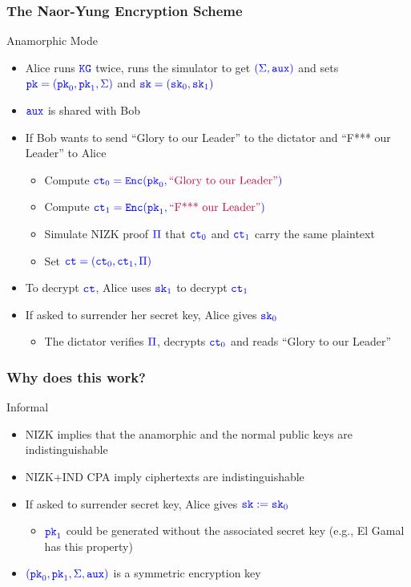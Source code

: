 \documentclass[handout]{beamer}
\begin{document}
\begin{frame}
\frametitle{The Naor-Yung Encryption Scheme}
\begin{exampleblock}{Anamorphic Mode}
\begin{itemize}
\item Alice runs $\color{blue} \mathtt{KG}$ twice, runs the simulator to get $\color{blue}(\Sigma,\mathtt{aux})$ 
and sets $\color{blue} \mathtt{pk}=(\mathtt{pk}_0,\mathtt{pk}_1,\Sigma)$ and $\color{blue} \mathtt{sk}=(\mathtt{sk}_0,\mathtt{sk}_1)$
\item $\color{blue}\mathtt{aux}$ is shared with Bob
\item If Bob wants to send {\color{purple} ``Glory to our Leader''} to the dictator
and {\color{purple} ``F*** our Leader''} to Alice
    \begin{itemize}
    \item Compute $\color{blue} \mathtt{ct}_0=\mathtt{Enc}(\mathtt{pk}_0,\text{\color{purple} ``Glory to our Leader''})$
    \item Compute $\color{blue} \mathtt{ct}_1=\mathtt{Enc}(\mathtt{pk}_1,\text{\color{purple} ``F*** our Leader''})$
    \item Simulate NIZK proof $\color{blue} \Pi$ that $\color{blue} \mathtt{ct}_0$ and $\color{blue} \mathtt{ct}_1$ carry the same    
        plaintext
    \item Set $\color{blue} \mathtt{ct}=(\mathtt{ct}_0,\mathtt{ct}_1,\Pi)$
    \end{itemize}
\item To decrypt $\color{blue} \mathtt{ct}$, Alice uses $\color{blue} \mathtt{sk}_1$ to decrypt $\color{blue} \mathtt{ct}_1$
\item If asked to surrender her secret key, Alice gives $\color{blue} \mathtt{sk}_0$ 
    \begin{itemize}
    \item The dictator verifies $\color{blue} \Pi$, decrypts $\color{blue} \mathtt{ct}_0$ and reads
        {\color{purple} ``Glory to our Leader''}
\end{itemize}
\end{itemize}
\end{exampleblock}
\end{frame}

\begin{frame}
\frametitle{Why does this work?}
\begin{block}{Informal}
\begin{itemize}
\item {\color{brown} NIZK} implies that  the 
    anamorphic and the normal {\color{blue} public keys}
        are indistinguishable
\item {\color{brown} NIZK+IND CPA} imply ciphertexts are indistinguishable 
\item If asked to surrender secret key, Alice gives $\color{blue} \mathtt{sk}:=\mathtt{sk}_0$
    \begin{itemize}
        \item $\color{blue} \mathtt{pk}_1$ could be generated without the associated secret key
            (e.g., El Gamal has this property)
    \end{itemize}
\item $\color{blue} (\mathtt{pk}_0,\mathtt{pk}_1,\Sigma,\mathtt{aux})$ is a symmetric encryption key
\end{itemize}
\end{block}
\end{frame}
\end{document}
